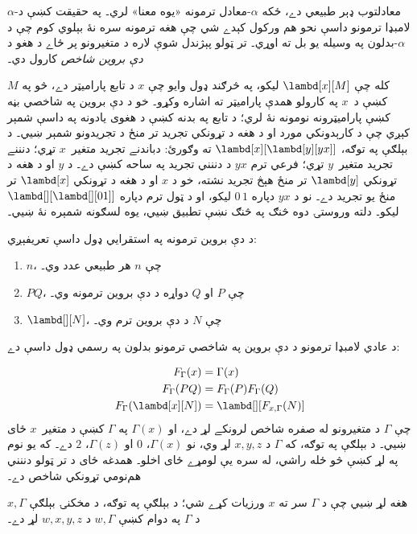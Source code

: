 \documentclass[../../../include/open-logic-section]{subfiles}
\begin{document}


$\alpha$-معادلتوب ډېر طبيعي دے، ځکه $\alpha$-معادل ترمونه «يوه معنا»
لري۔ په حقيقت کښې د لامبډا ترمونو داسې نحو هم ورکول کېدے شي چې
هغه ترمونه سره نۀ بېلوي کوم چې د $\alpha$-بدلون په وسيله يو بل ته
اوړي۔ تر ټولو پېژندل شوې لاره د متغيرونو پر ځاے د هغو د
\emph{دې بروين شاخص} کارول دي۔

کله چې $\lambd[x][M]$ ليکو، په څرګند ډول وايو چې $x$ د تابع
پاراميټر دے، څو په $M$ کښې د~$x$ په کارولو همدې پاراميټر ته
اشاره وکړو۔ خو د دې
بروين په شاخصي بڼه کښې پاراميټرونه نومونه نۀ لري؛ د تابع په بدنه
کښې د هغوی يادونه په داسې شمېر کېږي چې د کارېدونکي مورد او د هغه
د تړونکي تجريد تر منځ د تجريدونو شمېر ښيي۔ د بېلګې په توګه،
$\lambd[x][\lambd[y][y x]]$ ته وګورئ: دباندنے تجريد متغير~$x$
تړي؛ دنننے تجريد متغير~$y$ تړي؛ فرعي ترم $y x$ د دننني تجريد
په ساحه کښې دے۔ د $y$ او د هغه د تړونکي $\lambd[y]$ تر منځ
هېڅ تجريد نشته، خو د $x$ او د هغه د تړونکي $\lambd[x]$ تر منځ
يو تجريد دے۔ نو د $y x$ دپاره $0\, 1$ ليکو، او د ټول ترم
دپاره $\lambd[][\lambd[][01]]$ ليکو۔ دلته وروستۍ دوه څنګ په
څنګ نښې تطبيق ښيي، يوه لسګونه شمېره نۀ ښيي۔

\begin{defn}
  د دې بروين ترمونه په استقرايي ډول داسې تعريفېږي:
  \begin{enumerate}
  \item $n$، چې $n$ هر طبيعي عدد وي۔
  \item $PQ$، چې $P$ او $Q$ دواړه د دې بروين ترمونه وي۔
  \item $\lambd[][N]$، چې $N$ د دې بروين ترم وي۔
  \end{enumerate}
\end{defn}

د عادي لامبډا ترمونو د دې بروين په شاخصي ترمونو بدلون په رسمي ډول
داسې دے:
\begin{defn}
  \begin{align*}
    F_\Gamma(x) &= \Gamma(x) \\
    F_\Gamma(PQ) &= F_\Gamma(P)F_\Gamma(Q) \\
    F_\Gamma(\lambd[x][N]) &= \lambd[][F_{x,\Gamma}(N)]
  \end{align*}
  چې $\Gamma$ د متغيرونو له صفره شاخص لرونکے لړ دے، او
  $\Gamma(x)$ په $\Gamma$ کښې د متغير~$x$ ځای ښيي۔ د بېلګې په
  توګه، که $\Gamma$ د $x,y,z$ لړ وي، نو $\Gamma(x)$، $0$
  او $\Gamma(z)$، $2$ دے۔
  که يو نوم په لړ کښې څو ځله راشي، له سره يې لومړے ځای اخلو۔
  همدغه ځای د تر ټولو دننني هم‌نومي تړونکي شاخص دے۔

  $x,\Gamma$ هغه لړ ښيي چې د $\Gamma$ سر ته $x$ ورزيات کړے
  شي؛ د بېلګې په توګه، د مخکنۍ بېلګې د $\Gamma$ په دوام کښې
  $w,\Gamma$ د $w,x,y,z$ لړ دے۔
\end{defn}
\end{document}
